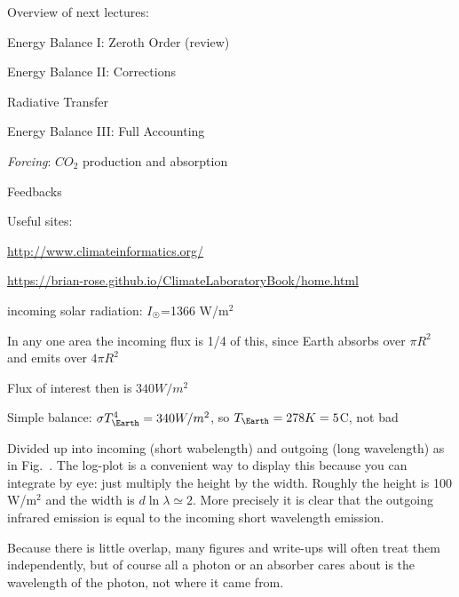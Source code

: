 \documentclass[11pt]{book}
\begin{document}

Overview of next lectures:
\bei
\item  Energy Balance I: Zeroth Order (review)
\item Energy Balance II: Corrections
\item Radiative Transfer
\item Energy Balance III: Full Accounting
\item {\it Forcing}: $CO_2$ production and absorption
\item Feedbacks
\eei

Useful sites:
\bee
\item\href{Cimateinfomatics}{http://www.climateinformatics.org/}
\item\href{The Climate Laboratory}{https://brian-rose.github.io/ClimateLaboratoryBook/home.html}
\eee


\bei
\item incoming solar radiation: $I_\Sun$=1366 W/m$^2$
\item In any one area the incoming flux is 1/4 of this, since Earth absorbs over $\pi R^2$ and emits over $4\pi R^2$
\item Flux of interest then is $340 W/m^2$
\item Simple balance: $\sigma T_\Earth^4 = 340 W/m^2$, so $T_\Earth=278K=5$C, not bad
\item Divided up into incoming (short wabelength) and outgoing (long wavelength) as in Fig.~. The log-plot is a convenient way to display this because you can integrate by eye: just multiply the height by the width. Roughly the height is 100 W/m$^2$ and the width is $d\ln\lambda \simeq 2$. More precisely it is clear that the outgoing infrared emission is equal to the incoming short wavelength emission.
\item Because there is little overlap, many figures and write-ups will often treat them independently, but of course all a photon or an absorber cares about is the wavelength of the photon, not where it came from.
\eei 

\end{document}
